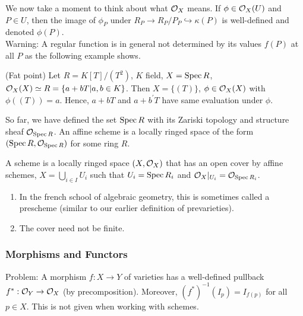 \documentclass[a4paper,11pt]{article}
\begin{document}
			We now take a moment to think about what $\mathcal{O}_X$ means. If $\phi\in\mathcal{O}_X(U)$ and $P\in U$, then the image of $\phi_P$ under $R_P\rightarrow R_P/P_P\hookrightarrow\kappa(P)$ is well-defined and denoted $\phi(P)$.
			\\

			Warning: A regular function is in general not determined by its values $f(P)$ at all $P$ as the following example shows.

			\begin{eg}(Fat point)
				Let $R=K[T]/(T^2)$, $K$ field, $X=\operatorname{Spec} R$, $\mathcal{O}_X(X)\simeq R=\{a+bT|a,b\in K\}$. Then $X=\{(T)\}$, $\phi\in\mathcal{O}_X(X)$ with $\phi((T))=a$. Hence, $a+bT$ and $a+b^\prime T$ have same evaluation under $\phi$.
			\end{eg}

			So far, we have defined the set $\operatorname{Spec} R$ with its Zariski topology and structure sheaf $\mathcal{O}_{\operatorname{Spec} R}$. An affine scheme is a locally ringed space of the form $(\operatorname{Spec} R,\mathcal{O}_{\operatorname{Spec} R})$ for some ring $R$.

			\begin{defi}
				A scheme is a locally ringed space $(X,\mathcal{O}_X)$ that has an open cover by affine schemes, $X=\bigcup_{i\in I}U_i$ such that $U_i=\operatorname{Spec} R_i$ and $\mathcal{O}_X|_{U_i}=\mathcal{O}_{\operatorname{Spec} R_i}$.
			\end{defi}

			\begin{remark}
				\begin{enumerate}
					\item In the french school of algebraic geometry, this is sometimes called a prescheme (similar to our earlier definition of prevarieties).
					\item The cover need not be finite.
				\end{enumerate}
			\end{remark}

			\subsubsection*{Morphisms and Functors}

				Problem: A morphism $f:X\rightarrow Y$ of varieties has a well-defined pullback $f^\ast:\mathcal{O}_Y\rightarrow\mathcal{O}_X$ (by precomposition). Moreover, $(f^\ast)^{-1}(I_p)=I_{f(p)}$ for all $p\in X$. This is not given when working with schemes.
\end{document}
